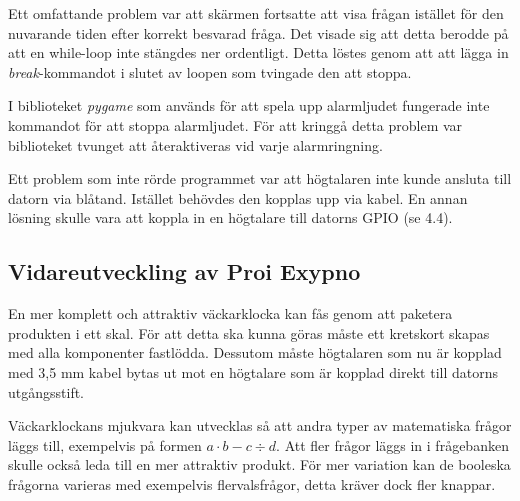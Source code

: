 Ett omfattande problem var att skärmen fortsatte att visa frågan istället för den nuvarande tiden efter korrekt besvarad fråga. Det visade sig att detta berodde på att en while-loop inte stängdes ner ordentligt. Detta löstes genom att att lägga in \emph{break}-kommandot i slutet av loopen som tvingade den att stoppa. 

I biblioteket \emph{pygame} som används för att spela upp alarmljudet fungerade inte kommandot för att stoppa alarmljudet. För att kringgå detta problem var biblioteket tvunget att återaktiveras vid varje alarmringning.

Ett problem som inte rörde programmet var att högtalaren inte kunde ansluta till datorn via blåtand. Istället behövdes den kopplas upp via kabel. En annan lösning skulle vara att koppla in en högtalare till datorns GPIO (se 4.4).

\subsection{Vidareutveckling av Proi Exypno}
En mer komplett och attraktiv väckarklocka kan fås genom att paketera produkten i ett skal. För att detta ska kunna göras måste ett kretskort skapas med alla komponenter fastlödda. Dessutom måste högtalaren som nu är kopplad med 3,5 mm kabel bytas ut mot en högtalare som är kopplad direkt till datorns utgångsstift. 

Väckarklockans mjukvara kan utvecklas så att andra typer av matematiska frågor läggs till, exempelvis på formen $a\cdot b - c\div d$.  Att fler frågor läggs in i frågebanken skulle också leda till en mer attraktiv produkt. För mer variation kan de booleska frågorna varieras med exempelvis flervalsfrågor, detta kräver dock fler knappar.